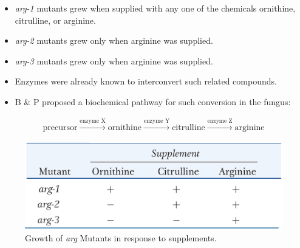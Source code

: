 \documentclass[11pt,dvipsnames,ignorenonframetext,aspectratio=169]{beamer}
\providecommand{\tightlist}{%
  \setlength{\itemsep}{0pt}\setlength{\parskip}{0pt}}
\begin{document}
\begin{frame}{}
\protect\hypertarget{section-7}{}

\begin{itemize}
\tightlist
\item
  \emph{arg-1} mutants grew when supplied with any one of the chemicals
  ornithine, citrulline, or arginine.
\item
  \emph{arg-2} mutants grew only when arginine was supplied.
\item
  \emph{arg-3} mutants grew only when arginine was supplied.
\item
  Enzymes were already known to interconvert such related compounds.
\item
  B \& P proposed a biochemical pathway for such conversion in the
  fungus:
\end{itemize}

\[
\begin{aligned}
\textrm{precursor} \xrightarrow{\text{enzyme X}} \textrm{ornithine} \xrightarrow{\text{enzyme Y}} \textrm{citrulline} \xrightarrow{\text{enzyme Z}} \textrm{arginine}
\end{aligned}
\]

\begin{figure}
\includegraphics[width=0.4\linewidth]{./../images/mutant_growth_supplements} \caption{Growth of \textit{arg} Mutants in response to supplements.}\label{fig:mutants-supplements}
\end{figure}

\end{frame}
\end{document}
